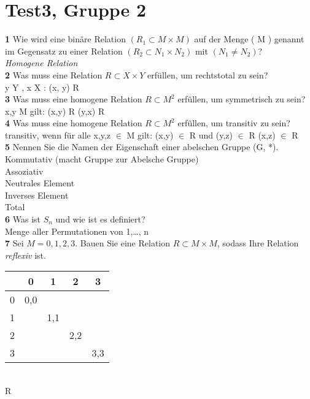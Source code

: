 \documentclass[11pt]{article}
\begin{document}
{{\section{Test3, Gruppe 2}\label{sec:test3-gruppe-2}
    \textbf{1} Wie wird eine binäre Relation $( R_1 \subset M \times M )$ auf der Menge ( M ) genannt im Gegensatz zu einer Relation $( R_2 \subset N_1 \times N_2 )$ mit $( N_1 \neq N_2 )$?\\
    {\itshape Homogene Relation}\\

    \textbf{2} Was muss eine Relation $ R \subset X \times Y $ erfüllen, um rechtstotal zu sein?\\
    \forall y \in Y , \exists x \in X : (x, y) \in R\\

    \textbf{3} Was muss eine homogene Relation $ R \subset M^2 $ erfüllen, um symmetrisch zu sein?\\
    \forall x,y \in M gilt: (x,y) \in R \rightarrow (y,x) \in R \\

    \textbf{4} Was muss eine homogene Relation $ R \subset M^2 $ erfüllen, um transitiv zu sein?\\
    transitiv, wenn für alle x,y,z $\in$ M gilt: (x,y) $\in$ R und (y,z) $\in$ R \rightarrow (x,z) $\in$ R\\

    \textbf{5} Nennen Sie die Namen der Eigenschaft einer abelschen Gruppe (G, *).\\
    Kommutativ (macht Gruppe zur Abelsche Gruppe)\\
    Assoziativ\\
    Neutrales Element\\
    Inverses Element\\
    Total\\

    \textbf{6} Was ist $S_n$ und wie ist es definiert?\\
    Menge aller Permutationen von {1,\ldots, n}\\

    \textbf{7} Sei $M = {0,1,2,3}$. Bauen Sie eine Relation $R \subset M \times M$, sodass Ihre Relation {\itshape reflexiv} ist.\\
\begin{tabular}{c|cccc}
    & 0 & 1 & 2 & 3 \\
    \hline
    0 & 0,0 & & & \\
    1 & & 1,1 & & \\
    2 & & & 2,2 & \\
    3 & & & & 3,3 \\
\end{tabular}\\
R \\


}}
\end{document}
